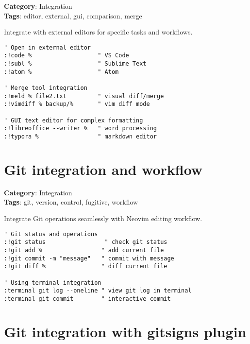{{{{{\textbf{Category}: Integration\\ \textbf{Tags}: editor, external, gui, comparison, merge
\vspace{0.5cm}

Integrate with external editors for specific tasks and workflows.

\begin{Exa*}{}
\begin{Verbatim}[fontsize=\footnotesize, breaklines, breakanywhere]
" Open in external editor
:!code %                   " VS Code
:!subl %                   " Sublime Text
:!atom %                   " Atom

" Merge tool integration
:!meld % file2.txt         " visual diff/merge
:!vimdiff % backup/%       " vim diff mode

" GUI text editor for complex formatting
:!libreoffice --writer %   " word processing
:!typora %                 " markdown editor
\end{Verbatim}
\end{Exa*}

\section{Git integration and workflow}

\textbf{Category}: Integration\\ \textbf{Tags}: git, version, control, fugitive, workflow
\vspace{0.5cm}

Integrate Git operations seamlessly with Neovim editing workflow.

\begin{Exa*}{}
\begin{Verbatim}[fontsize=\footnotesize, breaklines, breakanywhere]
" Git status and operations
:!git status                 " check git status
:!git add %                 " add current file
:!git commit -m "message"   " commit with message
:!git diff %                " diff current file

" Using terminal integration
:terminal git log --oneline " view git log in terminal
:terminal git commit        " interactive commit
\end{Verbatim}
\end{Exa*}

\section{Git integration with gitsigns plugin}

}}}}}
